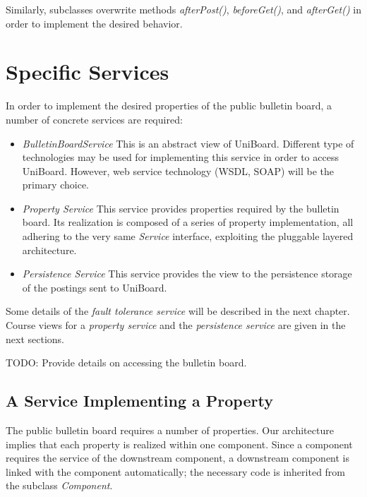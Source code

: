 \documentclass[oneside]{scrreprt}
\newcommand{\uniboard}{\mbox{UniBoard}}
\begin{document}
Similarly, subclasses overwrite methods \emph{afterPost()},
\emph{beforeGet()}, and \emph{afterGet()} in order to implement
the desired behavior.


\chapter{Specific Services}

In order to implement the desired properties of the public bulletin board,
 a number of concrete services are required:

\begin{itemize}
	\item \emph{BulletinBoardService} This is an abstract view
		of \uniboard. Different type of technologies may be used
		for implementing this service in order to access
		\uniboard. However, web service
		technology (WSDL, SOAP) will be the primary choice.
	\item \emph{Property Service} This service provides properties required by the bulletin board. Its
		realization is composed of a series of property
		implementation, all adhering to the very same
		\emph{Service} interface, exploiting the pluggable
		layered architecture.
	\item \emph{Persistence Service} This service provides
		the view to the persistence storage of the postings
		sent to \uniboard.
\end{itemize}

Some details of the \emph{fault tolerance service} will be described
in the next chapter. Course views for a \emph{property service}
and the \emph{persistence service} are given in the next sections.

TODO: Provide details on accessing the bulletin board.


\section{A Service Implementing a Property}

The public bulletin board requires a number of properties. Our
architecture implies that each property is realized within
one component. Since a component requires the service of
the downstream component, a downstream component is
linked with the component automatically; the necessary
code is inherited from the subclass \emph{Component}.
\end{document}
